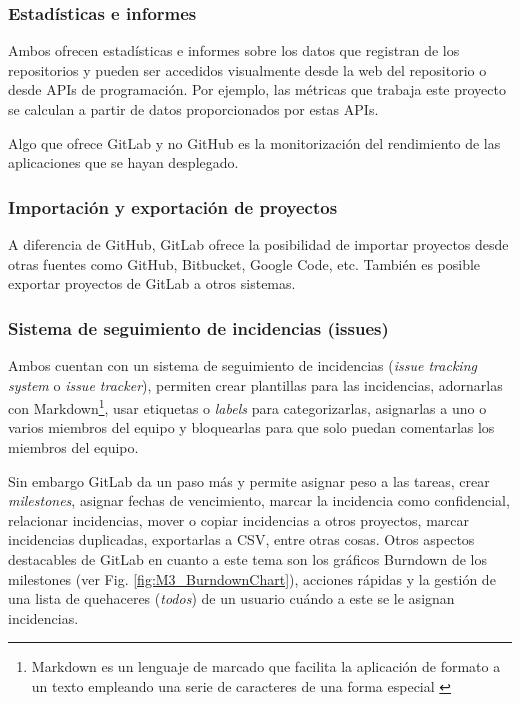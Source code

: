 
\subsubsection{Estadísticas e informes}
Ambos ofrecen estadísticas e informes sobre los datos que registran de los repositorios y pueden ser accedidos visualmente desde la web del repositorio o desde APIs de programación. Por ejemplo, las métricas que trabaja este proyecto se calculan a partir de datos proporcionados por estas APIs.

Algo que ofrece GitLab y no GitHub es la monitorización del rendimiento de las aplicaciones que se hayan desplegado.

\subsubsection{Importación y exportación de proyectos}
A diferencia de GitHub, GitLab ofrece la posibilidad de importar proyectos desde otras fuentes como GitHub, Bitbucket, Google Code, etc. También es posible exportar proyectos de GitLab a otros sistemas.

\subsubsection{Sistema de seguimiento de incidencias (issues)}
Ambos cuentan con un sistema de seguimiento de incidencias (\textit{issue tracking system} o \textit{issue tracker}), permiten crear plantillas para las incidencias, adornarlas con Markdown\footnote{Markdown es un lenguaje de marcado que facilita la aplicación de formato a un texto empleando una serie de caracteres de una forma especial \citep{lasso_que_2013}}, usar etiquetas o \textit{labels} para categorizarlas, asignarlas a uno o varios miembros del equipo y bloquearlas para que solo puedan comentarlas los miembros del equipo.

Sin embargo GitLab da un paso más y permite asignar peso a las tareas, crear \textit{milestones}, asignar fechas de vencimiento, marcar la incidencia como confidencial, relacionar incidencias, mover o copiar incidencias a otros proyectos, marcar incidencias duplicadas, exportarlas a CSV, entre otras cosas. Otros aspectos destacables de GitLab en cuanto a este tema son los gráficos Burndown de los milestones (ver Fig. \ref{fig:M3_BurndownChart}), acciones rápidas y la gestión de una lista de quehaceres (\textit{todos}) de un usuario cuándo a este se le asignan incidencias.


